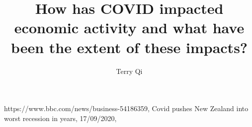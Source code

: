 \documentclass[a4paper,12pt]{article}
\title{How has COVID impacted economic activity and what have been the extent of these impacts?}
\author{Terry Qi}
\begin{document}
\maketitle
\newpage


https://www.bbc.com/news/business-54186359, Covid pushes New Zealand into worst recession in years, 17/09/2020, 
\end{document}
